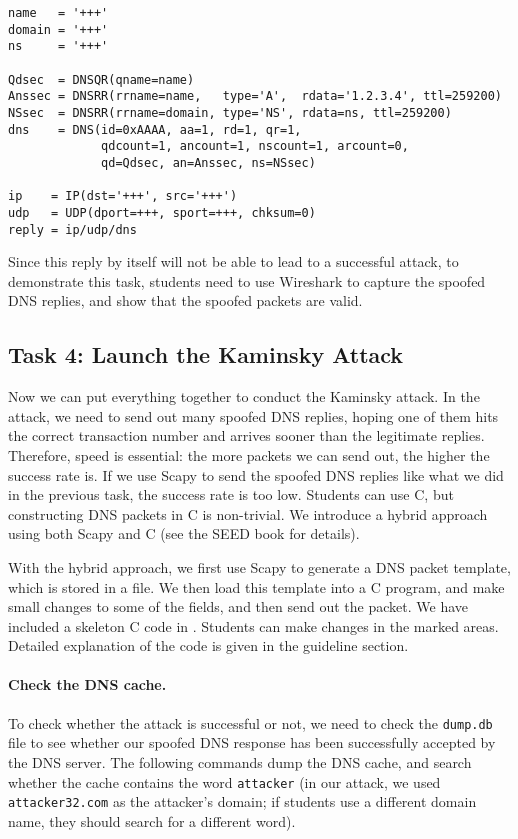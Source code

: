 \begin{lstlisting}
name   = '+++'  
domain = '+++'  
ns     = '+++'

Qdsec  = DNSQR(qname=name)
Anssec = DNSRR(rrname=name,   type='A',  rdata='1.2.3.4', ttl=259200)
NSsec  = DNSRR(rrname=domain, type='NS', rdata=ns, ttl=259200)
dns    = DNS(id=0xAAAA, aa=1, rd=1, qr=1,
             qdcount=1, ancount=1, nscount=1, arcount=0,
             qd=Qdsec, an=Anssec, ns=NSsec)

ip    = IP(dst='+++', src='+++')
udp   = UDP(dport=+++, sport=+++, chksum=0)
reply = ip/udp/dns
\end{lstlisting}
 

Since this reply by itself will not be able to lead to a successful 
attack, to demonstrate this task, students need to 
use Wireshark to capture the spoofed DNS replies, and 
show that the spoofed packets are valid. 


\subsection{Task 4: Launch the Kaminsky Attack}   

Now we can put everything together to conduct the Kaminsky attack. 
In the attack, we need to send out many spoofed DNS replies, hoping 
one of them hits the correct transaction number and arrives sooner
than the legitimate replies. Therefore, speed is essential: the more packets 
we can send out, the higher the success rate is. If we use 
Scapy to send the spoofed DNS replies like what we did in the 
previous task, the success rate is too low. Students can use 
C, but constructing DNS packets in C is non-trivial. 
We introduce a hybrid approach using both Scapy and C (see the SEED
book for details). 


With the hybrid approach, we first use Scapy to generate 
a DNS packet template, which is stored in a file. 
We then load this template into a C program, and make 
small changes to some of the fields, and then send 
out the packet. 
We have included a skeleton C code
in . 
Students can make changes
in the marked areas. Detailed explanation
of the code is given in the guideline section. 



\paragraph{Check the DNS cache.}
To check whether the attack is successful or not, we need to 
check the {\tt dump.db} file to see whether our spoofed DNS
response has been successfully accepted by the DNS server. 
The following commands dump the DNS cache, and search whether
the cache contains the word \texttt{attacker} (in our 
attack, we used \texttt{attacker32.com} as the attacker's 
domain; if students use a different domain name, they should 
search for a different word).  


